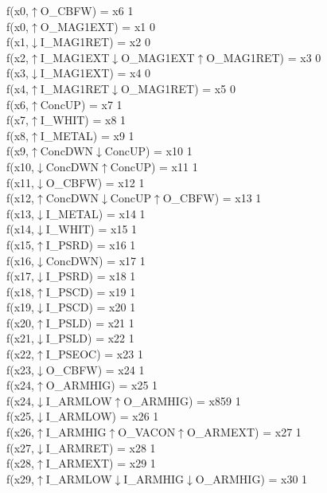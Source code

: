 f(x0,$\uparrow$O\_CBFW) = x6 {1} \\
f(x0,$\uparrow$O\_MAG1EXT) = x1 {0} \\
f(x1,$\downarrow$I\_MAG1RET) = x2 {0} \\
f(x2,$\uparrow$I\_MAG1EXT$\downarrow$O\_MAG1EXT$\uparrow$O\_MAG1RET) = x3 {0} \\
f(x3,$\downarrow$I\_MAG1EXT) = x4 {0} \\
f(x4,$\uparrow$I\_MAG1RET$\downarrow$O\_MAG1RET) = x5 {0} \\
f(x6,$\uparrow$ConcUP) = x7 {1} \\
f(x7,$\uparrow$I\_WHIT) = x8 {1} \\
f(x8,$\uparrow$I\_METAL) = x9 {1} \\
f(x9,$\uparrow$ConcDWN$\downarrow$ConcUP) = x10 {1} \\
f(x10,$\downarrow$ConcDWN$\uparrow$ConcUP) = x11 {1} \\
f(x11,$\downarrow$O\_CBFW) = x12 {1} \\
f(x12,$\uparrow$ConcDWN$\downarrow$ConcUP$\uparrow$O\_CBFW) = x13 {1} \\
f(x13,$\downarrow$I\_METAL) = x14 {1} \\
f(x14,$\downarrow$I\_WHIT) = x15 {1} \\
f(x15,$\uparrow$I\_PSRD) = x16 {1} \\
f(x16,$\downarrow$ConcDWN) = x17 {1} \\
f(x17,$\downarrow$I\_PSRD) = x18 {1} \\
f(x18,$\uparrow$I\_PSCD) = x19 {1} \\
f(x19,$\downarrow$I\_PSCD) = x20 {1} \\
f(x20,$\uparrow$I\_PSLD) = x21 {1} \\
f(x21,$\downarrow$I\_PSLD) = x22 {1} \\
f(x22,$\uparrow$I\_PSEOC) = x23 {1} \\
f(x23,$\downarrow$O\_CBFW) = x24 {1} \\
f(x24,$\uparrow$O\_ARMHIG) = x25 {1} \\
f(x24,$\downarrow$I\_ARMLOW$\uparrow$O\_ARMHIG) = x859 {1} \\
f(x25,$\downarrow$I\_ARMLOW) = x26 {1} \\
f(x26,$\uparrow$I\_ARMHIG$\uparrow$O\_VACON$\uparrow$O\_ARMEXT) = x27 {1} \\
f(x27,$\downarrow$I\_ARMRET) = x28 {1} \\
f(x28,$\uparrow$I\_ARMEXT) = x29 {1} \\
f(x29,$\uparrow$I\_ARMLOW$\downarrow$I\_ARMHIG$\downarrow$O\_ARMHIG) = x30 {1} \\
